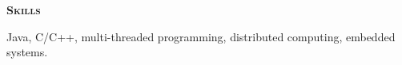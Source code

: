 \documentclass[10pt, letterpaper]{article}
\newlength{\firstoffset}
\newcommand{\myscitem}[1]{\vspace{0.5\baselineskip} {\Large \textbf{\textsc{#1}} \reallynopagebreak}}
\newcommand{\mydate}[1]{{\small #1}}
\newcommand{\myright}{\hspace*\fill}
\newcommand{\myrightdate}[1]{\myright \mydate{#1}}
\newenvironment{myexp}{
  \begin{list}{}{
      \setlength{\itemindent}{-0.15in}
      \setlength{\leftmargin}{0.3in}
      \addtolength{\topsep}{-0.1in}
    }
}{\end{list}}
\newenvironment{mybullet}{
  \begin{list}{\labelitemi}{
      \setlength{\itemindent}{0in}
      \setlength{\leftmargin}{0.15in}
      \setlength{\topsep}{0.02in}
      \setlength{\partopsep}{0pt}
    }
}{\end{list}}
\begin{document}
\thispagestyle{first}
\enlargethispage*{-\firstoffset}






\myscitem{Skills}
\begin{myexp}
\item Java, C/C++, multi-threaded programming, distributed computing, embedded
  systems.
\end{myexp}




%







\end{document}
